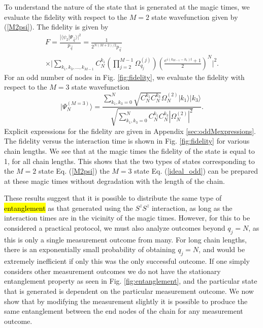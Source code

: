 \documentclass[%
  prx,%
  twocolumn,%
  preprintnumbers,%
  amsmath,%
  amssymb,%
  superscriptaddress%
]{revtex4}
\begin{document}
To understand the nature of the state that is generated at the magic times,  we evaluate the fidelity with respect to the $ M = 2$ state wavefunction given by (\ref{M2psi}). The fidelity is given by
%
\begin{multline}
F = \frac{| \langle  \psi_2 | \Psi_{\vec{q}} \rangle |^2}{p_{\vec{q}}}  = \frac{1}{2^{N(M+2)/2} p_{\vec{q}} } \\
\times \Big| \sum_{k_1, k_3, \dots, k_{M-1} }C_N^{k_1}
\left( \prod_{j=2}^{M-1} \Omega_{q_j}^{(j)} \right) \left(\frac{e^{i(k_{M-1} - k_1)t }+1}{2}\right)^N \Big|^2 .
\label{fideven}
\end{multline}
%
For an odd number of nodes in Fig. \ref{fig:fidelity}, we evaluate the fidelity with respect to the $ M = 3$ state wavefunction
%
\begin{equation}
    \label{ideal_odd}
| \Psi_N^{(M=3)}  \rangle=\frac{\sum_{k_1,k_3=0}^{N} \sqrt{ C^{k_1}_{N}  C^{k_3}_{N} }
 \Omega_{N}^{(2)}  |k_1\rangle|k_3\rangle }{\sqrt{\sum_{k_1,k_3=0}^{N}  C^{k_1}_{N}  C^{k_3}_{N} | \Omega_{N}^{(2)} |^2 } } .
\end{equation}
%
Explicit expressions for the fidelity are given in Appendix \ref{sec:oddMexpressions}.  The fidelity versus the interaction time is shown in Fig. \ref{fig:fidelity} for various chain lengths. We see that at the magic times the fidelity of the state is equal to 1, for all chain lengths.  This shows that the two types of states corresponding to the $ M = 2 $ state Eq. (\ref{M2psi}) the $ M = 3 $ state Eq. (\ref{ideal_odd}) can be prepared at these magic times without degradation with the length of the chain.

These results suggest that it is possible to distribute the same type of  \hl{entanglement} as that generated using the $ S^z S^z $ interaction, as long as the interaction times are in the vicinity of the magic times.  However, for this to be considered a practical protocol, we must also analyze outcomes beyond $ q_j = N $, as this is only a single measurement outcome from many.
For long chain lengths, there is an exponentially small probability of obtaining $ q_j = N $, and  would be extremely inefficient if only this was the only successful outcome.  If one simply considers other measurement outcomes we do not have the stationary entanglement property as seen in Fig. \ref{fig:entanglement}, and the particular state that is generated is dependent on the particular measurement outcome.  We now show that by modifying the measurement slightly it is possible to produce the same entanglement between the end nodes of the chain for any measurement outcome.
\end{document}
